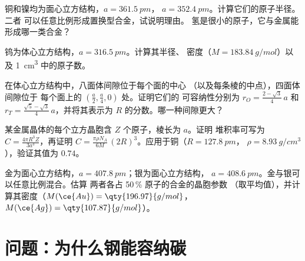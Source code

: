 \begin{exercise}[$\star\star$]\label{exo:b1:crystals-metals:8}
铜和镍均为面心立方结构，$a = \qty{361.5}{pm}$，
$a = \qty{352.4}{pm}$。计算它们的原子半径。二者
可以任意比例形成置换型合金，试说明理由。
氢是很小的原子，它与金属能形成哪一类合金？
\end{exercise}

\begin{exercise}[$\star\star$]\label{exo:b1:crystals-metals:9}
钨为体心立方结构，$a = \qty{316.5}{pm}$。计算其半径、
密度（$M = \qty{183.84}{g/mol}$）以及
\qty{1}{cm^3} 中的原子数。
\end{exercise}

\begin{exercise}[$\star\star\star$]\label{exo:b1:crystals-metals:10}
在体心立方结构中，八面体间隙位于每个面的中心
（以及每条棱的中点），四面体间隙位于
每个面上的 $(\frac{a}{2}, \frac{a}{4}, 0)$ 处。证明它们的
可容纳性分别为 $r_O = \frac{2 - \sqrt3}{4}\,a$ 和
$r_T = \frac{\sqrt5 - \sqrt3}{4}\,a$，并将其表示为
$R$ 的分数。哪一种间隙更大？
\end{exercise}

\begin{exercise}[$\star\star\star$]\label{exo:b1:crystals-metals:11}
某金属晶体的每个立方晶胞含 $Z$ 个原子，棱长为 $a$。证明
堆积率可写为 $C = \frac{4\pi R^3 Z}{3a^3}$，再证明
$C = \frac{\pi\rho N_A}{6M}\,(2R)^3$。应用于铜（$R = \qty{127.8}{pm}$，
$\rho = \qty{8.93}{g/cm^3}$），验证其值为 $0.74$。
\end{exercise}

\begin{exercise}[$\star\star\star$]\label{exo:b1:crystals-metals:12}
金为面心立方结构，$a = \qty{407.8}{pm}$；银为面心立方结构，
$a = \qty{408.6}{pm}$。金与银可以任意比例混合。估算
两者各占 50\,\% 原子的合金的晶胞参数
（取平均值），并计算其密度（$M(\ce{Au}) = \qty{196.97}{g/mol}$，
$M(\ce{Ag}) = \qty{107.87}{g/mol}$）。
\end{exercise}

\section{问题：为什么钢能容纳碳}

